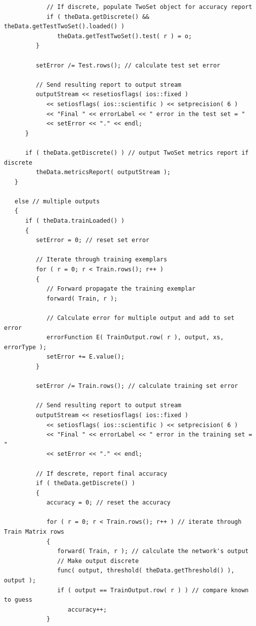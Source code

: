 \documentclass{report}[10pt]
\begin{document}
\begin{verbatim}
            // If discrete, populate TwoSet object for accuracy report
            if ( theData.getDiscrete() && theData.getTestTwoSet().loaded() )
               theData.getTestTwoSet().test( r ) = o;
         }
         
         setError /= Test.rows(); // calculate test set error
         
         // Send resulting report to output stream
         outputStream << resetiosflags( ios::fixed )
            << setiosflags( ios::scientific ) << setprecision( 6 )
            << "Final " << errorLabel << " error in the test set = "
            << setError << "." << endl;
      }
      
      if ( theData.getDiscrete() ) // output TwoSet metrics report if discrete
         theData.metricsReport( outputStream );
   }   
   
   else // multiple outputs
   {
      if ( theData.trainLoaded() )
      {
         setError = 0; // reset set error

         // Iterate through training exemplars
         for ( r = 0; r < Train.rows(); r++ )
         {
            // Forward propagate the training exemplar
            forward( Train, r );
               
            // Calculate error for multiple output and add to set error
            errorFunction E( TrainOutput.row( r ), output, xs, errorType );
            setError += E.value();
         }            
            
         setError /= Train.rows(); // calculate training set error            
            
         // Send resulting report to output stream
         outputStream << resetiosflags( ios::fixed )
            << setiosflags( ios::scientific ) << setprecision( 6 )
            << "Final " << errorLabel << " error in the training set = "
            << setError << "." << endl;

         // If descrete, report final accuracy
         if ( theData.getDiscrete() )
         {
            accuracy = 0; // reset the accuracy

            for ( r = 0; r < Train.rows(); r++ ) // iterate through Train Matrix rows
            {
               forward( Train, r ); // calculate the network's output
               // Make output discrete
               func( output, threshold( theData.getThreshold() ), output );
               if ( output == TrainOutput.row( r ) ) // compare known to guess
                  accuracy++;
            }


\end{verbatim}
\end{document}
